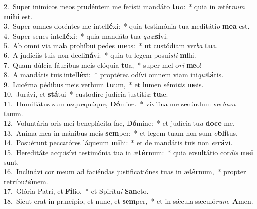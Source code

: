 {2.~}Super inimícos meos prudéntem me fecísti mandáto \textbf{tu}o:~* quia in ætér\textit{num} \textbf{mi}\textbf{hi} est.\\
{3.~}Super omnes docéntes me intel\textbf{lé}xi:~* quia testimónia tua meditáti\textit{o} \textbf{me}\textbf{a} est.\\
{4.~}Super senes intel\textbf{lé}xi:~* quia mandáta tua \textit{quæ}\textbf{sí}vi.\\
{5.~}Ab omni via mala prohíbui pedes \textbf{me}os:~* ut custódiam ver\textit{ba} \textbf{tu}a.\\
{6.~}A judíciis tuis non decli\textbf{ná}vi:~* quia tu legem posuí\textit{sti} \textbf{mi}hi.\\
{7.~}Quam dúlcia fáucibus meis elóquia \textbf{tu}a,~* super mel o\textit{ri} \textbf{me}o!\\
{8.~}A mandátis tuis intel\textbf{lé}xi:~* proptérea odívi omnem viam ini\textit{qui}\textbf{tá}tis.\\
{9.~}Lucérna pédibus meis verbum \textbf{tu}um,~* et lumen sémi\textit{tis} \textbf{me}is.\\
{10.~}Jurávi, et \textbf{stá}tui~* custodíre judícia justíti\textit{æ} \textbf{tu}æ.\\
{11.~}Humiliátus sum usquequáque, \textbf{Dó}mine:~* vivífica me secúndum ver\textit{bum} \textbf{tu}um.\\
{12.~}Voluntária oris mei beneplácita fac, \textbf{Dó}mine:~* et judícia tu\textit{a} \textbf{do}\textbf{ce} me.\\
{13.~}Anima mea in mánibus meis \textbf{sem}per:~* et legem tuam non sum \textit{o}\textbf{blí}tus.\\
{14.~}Posuérunt peccatóres láqueum \textbf{mi}hi:~* et de mandátis tuis non \textit{er}\textbf{rá}vi.\\
{15.~}Hereditáte acquisívi testimónia tua in æ\textbf{tér}num:~* quia exsultátio cor\textit{dis} \textbf{me}\textbf{i} sunt.\\
{16.~}Inclinávi cor meum ad faciéndas justificatiónes tuas in æ\textbf{tér}num,~* propter retribu\textit{ti}\textbf{ó}nem.\\
{17.~}Glória Patri, et \textbf{Fí}lio,~* et Spirítu\textit{i} \textbf{San}cto.\\
{18.~}Sicut erat in princípio, et nunc, et \textbf{sem}per,~* et in sǽcula sæculó\textit{rum}. \textbf{A}men.\\
